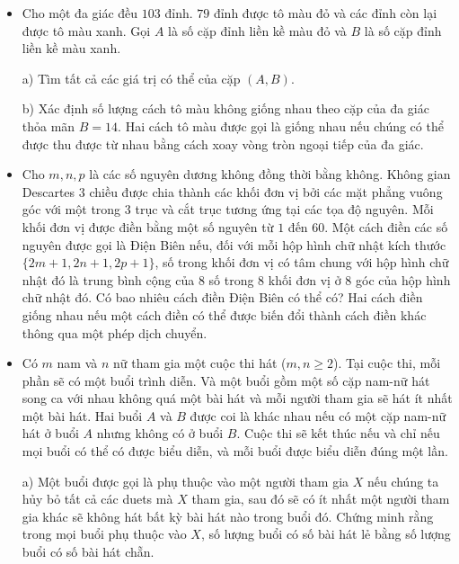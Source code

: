 \documentclass[11pt]{scrartcl}
\begin{document}
\begin{itemize}[label=, leftmargin=0em, itemsep=-0em]
    \item\begin{btvn}
        Cho một đa giác đều $103$ đỉnh. $79$ đỉnh được tô màu đỏ và các đỉnh còn lại được tô màu xanh. Gọi $A$ là số cặp đỉnh liền kề màu đỏ và $B$ là số cặp đỉnh liền kề màu xanh.


        a) Tìm tất cả các giá trị có thể của cặp $(A,B).$


        b) Xác định số lượng cách tô màu không giống nhau theo cặp của đa giác thỏa mãn $B=14.$ Hai cách tô màu được gọi là giống nhau nếu chúng có thể được thu được từ nhau bằng cách xoay vòng tròn ngoại tiếp của đa giác.
        \end{btvn}

    \item \begin{btvn}
    Cho $m,n, p$ là các số nguyên dương không đồng thời bằng không. Không gian Descartes $3$ chiều được chia thành các khối đơn vị bởi các mặt phẳng vuông góc với một trong $3$ trục và cắt trục tương ứng tại các tọa độ nguyên. Mỗi khối đơn vị được điền bằng một số nguyên từ $1$ đến $60$. Một cách điền các số nguyên được gọi là Điện Biên nếu, đối với mỗi hộp hình chữ nhật kích thước $\{2m+1,2n+1,2p+1\}$, số trong khối đơn vị có tâm chung với hộp hình chữ nhật đó là trung bình cộng của $8$ số trong $8$ khối đơn vị ở $8$ góc của hộp hình chữ nhật đó. Có bao nhiêu cách điền Điện Biên có thể có?
    Hai cách điền giống nhau nếu một cách điền có thể được biến đổi thành cách điền khác thông qua một phép dịch chuyển.
    \end{btvn}

    \item \begin{btvn}
        Có $m$ nam và $n$ nữ tham gia một cuộc thi hát ($m, n \geq 2$). Tại cuộc thi, mỗi phần sẽ có một buổi trình diễn. Và một buổi gồm một số cặp nam-nữ hát song ca với nhau không quá một bài hát và mỗi người tham gia sẽ hát ít nhất một bài hát. Hai buổi $A$ và $B$ được coi là khác nhau nếu có một cặp nam-nữ hát ở buổi $A$ nhưng không có ở buổi $B$. Cuộc thi sẽ kết thúc nếu và chỉ nếu mọi buổi có thể có được biểu diễn, và mỗi buổi được biểu diễn đúng một lần.


        a) Một buổi được gọi là phụ thuộc vào một người tham gia $X$ nếu chúng ta hủy bỏ tất cả các duets mà $X$ tham gia, sau đó sẽ có ít nhất một người tham gia khác sẽ không hát bất kỳ bài hát nào trong buổi đó. Chứng minh rằng trong mọi buổi phụ thuộc vào $X$, số lượng buổi có số bài hát lẻ bằng số lượng buổi có số bài hát chẵn.



\end{btvn}
\end{itemize}
\end{document}
